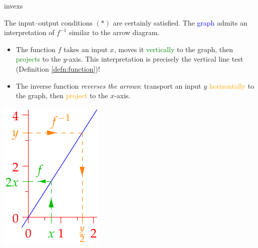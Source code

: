 \begin{examples}{}{invexs}
	\begin{enumerate}\setcounter{enumi}{1}
		\begin{minipage}[t]{0.79\linewidth}\vspace{-10pt}
			\item[]The input--output conditions $(\ast)$ are certainly satisfied.
			\smallbreak
			The \textcolor{blue}{graph} admits an interpretation of $f^{-1}$ similar to the arrow diagram.
			\begin{itemize}\itemsep2pt
			  \item The function $f$ takes an input $x$, moves it \textcolor{Green}{vertically} to the graph, then \textcolor{Green}{projects} to the $y$-axis. This interpretation is precisely the vertical line test (Definition \ref{defn:function})!
			  \item The inverse function \emph{reverses the arrows}: transport an input $y$ \textcolor{orange}{horizontally} to the graph, then \textcolor{orange}{project} to the $x$-axis.
			\end{itemize}
		\end{minipage}
		\hfill
		\begin{minipage}[t]{0.2\linewidth}\vspace{-25pt}
			\flushright
			\includegraphics{inverses-line}
		\end{minipage}
		\smallbreak


\end{enumerate}
\end{examples}

